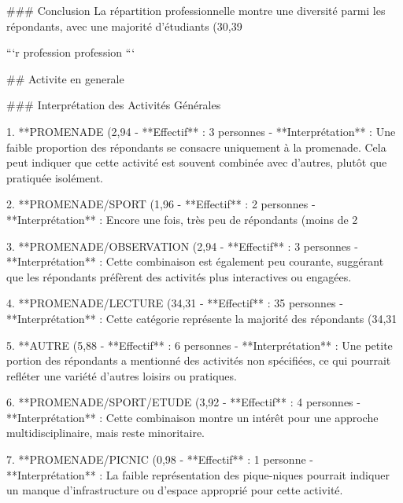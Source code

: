 ### Conclusion
La répartition professionnelle montre une diversité parmi les répondants, avec une majorité d'étudiants (30,39%


```{r profession}
profession
```

## Activite en generale

### Interprétation des Activités Générales

1. **PROMENADE (2,94%
   - **Effectif** : 3 personnes
   - **Interprétation** : Une faible proportion des répondants se consacre uniquement à la promenade. Cela peut indiquer que cette activité est souvent combinée avec d'autres, plutôt que pratiquée isolément.

2. **PROMENADE/SPORT (1,96%
   - **Effectif** : 2 personnes
   - **Interprétation** : Encore une fois, très peu de répondants (moins de 2%

3. **PROMENADE/OBSERVATION (2,94%
   - **Effectif** : 3 personnes
   - **Interprétation** : Cette combinaison est également peu courante, suggérant que les répondants préfèrent des activités plus interactives ou engagées.

4. **PROMENADE/LECTURE (34,31%
   - **Effectif** : 35 personnes
   - **Interprétation** : Cette catégorie représente la majorité des répondants (34,31%

5. **AUTRE (5,88%
   - **Effectif** : 6 personnes
   - **Interprétation** : Une petite portion des répondants a mentionné des activités non spécifiées, ce qui pourrait refléter une variété d'autres loisirs ou pratiques.

6. **PROMENADE/SPORT/ETUDE (3,92%
   - **Effectif** : 4 personnes
   - **Interprétation** : Cette combinaison montre un intérêt pour une approche multidisciplinaire, mais reste minoritaire.

7. **PROMENADE/PICNIC (0,98%
   - **Effectif** : 1 personne
   - **Interprétation** : La faible représentation des pique-niques pourrait indiquer un manque d'infrastructure ou d'espace approprié pour cette activité.

